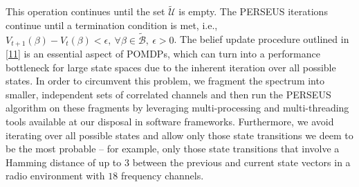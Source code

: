 \documentclass[10pt,twocolumn]{IEEEtran}
\begin{document}
This operation continues until the set $\tilde{\mathcal{U}}$ is empty. The PERSEUS iterations continue until a termination condition is met, i.e., $V_{t{+}1}(\beta){-}V_{t}(\beta){<}\epsilon,\ \forall \beta{\in} \tilde{\mathcal{B}},\ \epsilon{>}0$. The belief update procedure outlined in \eqref{11} is an essential aspect of POMDPs, which can turn into a performance bottleneck for large state spaces due to the inherent iteration over all possible states. In order to circumvent this problem, we fragment the spectrum into smaller, independent sets of correlated channels and then run the PERSEUS algorithm on these fragments by leveraging multi-processing and multi-threading tools available at our disposal in software frameworks. Furthermore, we avoid iterating over all possible states and allow only those state transitions we deem to be the most probable -- for example, only those state transitions that involve a Hamming distance of up to $3$ between the previous and current state vectors in a radio environment with $18$ frequency channels.
\vspace{-4mm}
\end{document}
